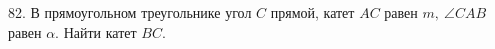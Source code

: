 82. В прямоугольном треугольнике угол $C$ прямой, катет $AC$ равен $m,\ \angle CAB$ равен $\alpha.$ Найти катет $BC.$\\
